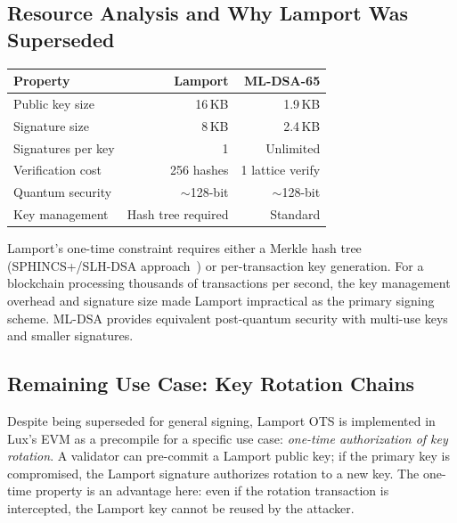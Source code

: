 \documentclass[11pt,a4paper]{article}
\begin{document}
\subsection{Resource Analysis and Why Lamport Was Superseded}

\begin{center}
\begin{tabular}{lrr}
\toprule
\textbf{Property} & \textbf{Lamport} & \textbf{ML-DSA-65} \\
\midrule
Public key size & 16\,KB & 1.9\,KB \\
Signature size & 8\,KB & 2.4\,KB \\
Signatures per key & 1 & Unlimited \\
Verification cost & 256 hashes & 1 lattice verify \\
Quantum security & $\sim$128-bit & $\sim$128-bit \\
Key management & Hash tree required & Standard \\
\bottomrule
\end{tabular}
\end{center}

Lamport's one-time constraint requires either a Merkle hash tree
(SPHINCS+/SLH-DSA approach~\cite{sphincs2017}) or per-transaction
key generation. For a blockchain processing thousands of transactions
per second, the key management overhead and signature size made
Lamport impractical as the primary signing scheme. ML-DSA provides
equivalent post-quantum security with multi-use keys and smaller
signatures.

\subsection{Remaining Use Case: Key Rotation Chains}

Despite being superseded for general signing, Lamport OTS is
implemented in Lux's EVM as a precompile for a specific use case:
\emph{one-time authorization of key rotation}. A validator can
pre-commit a Lamport public key; if the primary key is compromised,
the Lamport signature authorizes rotation to a new key. The one-time
property is an advantage here: even if the rotation transaction is
intercepted, the Lamport key cannot be reused by the attacker.

\end{document}
